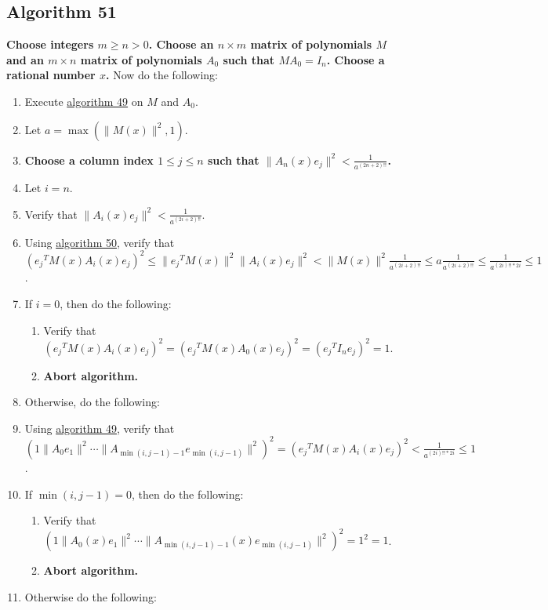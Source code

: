 \documentclass[twocolumn]{article}
\begin{document}
		\subsection{Algorithm 51}\label{sec:algorithm 51}
			\textbf{Choose integers $m\ge n>0$. Choose an $n\times m$ matrix of polynomials $M$ and an $m\times n$ matrix of polynomials $A_0$ such that $MA_0=I_n$. Choose a rational number $x$.} Now do the following:
			\begin{enumerate}
				\item Execute \hyperref[sec:algorithm 49]{algorithm 49} on $M$ and $A_0$.
				\item Let $a=\max(\lVert M(x)\rVert^2,1)$.
				\item \textbf{Choose a column index $1\le j\le n$ such that $\lVert A_n(x)e_j\rVert^2<\frac{1}{a^{(2n+2)!!}}$.}
				\item Let $i=n$.
				\item Verify that $\lVert A_i(x)e_j\rVert^2<\frac{1}{a^{(2i+2)!!}}$.
				\item Using \hyperref[sec:algorithm 50]{algorithm 50}, verify that $({e_j}^TM(x)A_i(x)e_j)^2\le\lVert{e_j}^TM(x)\rVert^2\lVert A_i(x)e_j\rVert^2<\lVert M(x)\rVert^2\frac{1}{a^{(2i+2)!!}}\le a\frac{1}{a^{(2i+2)!!}}\le\frac{1}{a^{(2i)!!*2i}}\le 1$.
				\item If $i=0$, then do the following:
				\begin{enumerate}
					\item Verify that $({e_j}^TM(x)A_i(x)e_j)^2=({e_j}^TM(x)A_0(x)e_j)^2=({e_j}^TI_ne_j)^2=1$.
					\item \textbf{Abort algorithm.}
				\end{enumerate}
				\item Otherwise, do the following:
				\item Using \hyperref[sec:algorithm 49]{algorithm 49}, verify that $(1\lVert A_0e_1\rVert^2\cdots\lVert A_{\min(i,j-1)-1}e_{\min(i,j-1)}\rVert^2)^2=({e_j}^TM(x)A_i(x)e_j)^2<\frac{1}{a^{(2i)!!*2i}}\le 1$.
				\item If $\min(i,j-1)=0$, then do the following:
				\begin{enumerate}
					\item Verify that $(1\lVert A_0(x)e_1\rVert^2\cdots\lVert A_{\min(i,j-1)-1}(x)e_{\min(i,j-1)}\rVert^2)^2=1^2=1$.
					\item \textbf{Abort algorithm.}
				\end{enumerate}
				\item Otherwise do the following:
				\begin{enumerate}

\end{enumerate}
\end{enumerate}
\end{document}
